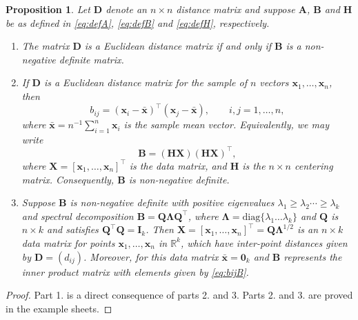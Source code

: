 \documentclass[]{book}
\newtheorem{proposition}{Proposition}[chapter]
\theoremstyle{definition}
\theoremstyle{definition}
\theoremstyle{definition}
\theoremstyle{remark}
\begin{document}
\begin{proposition}
\protect\hypertarget{prp:five1}{}{\label{prp:five1} }Let \(\boldsymbol D\) denote an \(n \times n\) distance matrix and suppose \(\boldsymbol A\), \(\boldsymbol B\) and \(\mathbf H\) be as defined in \eqref{eq:defA}, \eqref{eq:defB} and \eqref{eq:defH}, respectively.

\begin{enumerate}
\def\labelenumi{\arabic{enumi}.}
\item
  The matrix \(\boldsymbol D\) is a Euclidean distance matrix if and only if \(\boldsymbol B\) is a non-negative definite matrix.
\item
  If \(\boldsymbol D\) is a Euclidean distance matrix for the sample of \(n\) vectors \(\boldsymbol x_1,\ldots , \boldsymbol x_n\), then
  \begin{equation}
  b_{ij}=(\boldsymbol x_i-\bar{\boldsymbol x})^\top (\boldsymbol x_j - \bar{\boldsymbol x}), \qquad i,j=1,\ldots , n,
  \label{eq:bijB}
  \end{equation}
  where \(\bar{\mathbf x}=n^{-1}\sum_{i=1}^n \boldsymbol x_i\) is the sample mean vector. Equivalently, we may write
  \[
  \boldsymbol B= ({\mathbf H} {\mathbf X})({\mathbf H} {\mathbf X})^\top,
  \]
  where \({\mathbf X}=[\boldsymbol x_1,\ldots , \boldsymbol x_n]^\top\) is the data matrix, and \(\boldsymbol H\) is the \(n \times n\) centering matrix. Consequently,
  \(\boldsymbol B\) is non-negative definite.
\item
  Suppose \(\boldsymbol B\) is non-negative definite with positive eigenvalues \(\lambda_1 \geq \lambda_2 \cdots \geq \lambda_k\) and spectral decomposition \(\boldsymbol B={\mathbf Q} {\pmb \Lambda}{\mathbf Q}^\top\), where \({\pmb \Lambda}=\text{diag}\{\lambda_1 \ldots \lambda_k\}\) and \(\mathbf Q\) is \(n \times k\) and satisfies \({\mathbf Q}^\top {\mathbf Q}={\mathbf I}_k\). Then \({\mathbf X}=[\boldsymbol x_1, \ldots , \boldsymbol x_n]^\top={\mathbf Q}{\pmb \Lambda}^{1/2}\) is an \(n \times k\) data matrix for points \(\boldsymbol x_1, \ldots , \boldsymbol x_n\) in \(\mathbb{R}^k\), which have inter-point distances given by \(\boldsymbol D=(d_{ij})\). Moreover, for this data matrix \(\bar{\boldsymbol x}={\mathbf 0}_k\) and \(\boldsymbol B\) represents the inner product matrix with elements given by \eqref{eq:bijB}.
\end{enumerate}
\end{proposition}

\begin{proof}
{}Part 1. is a direct consequence of parts 2. and 3. Parts 2. and 3. are proved in the example sheets.
\end{proof}
\end{document}
